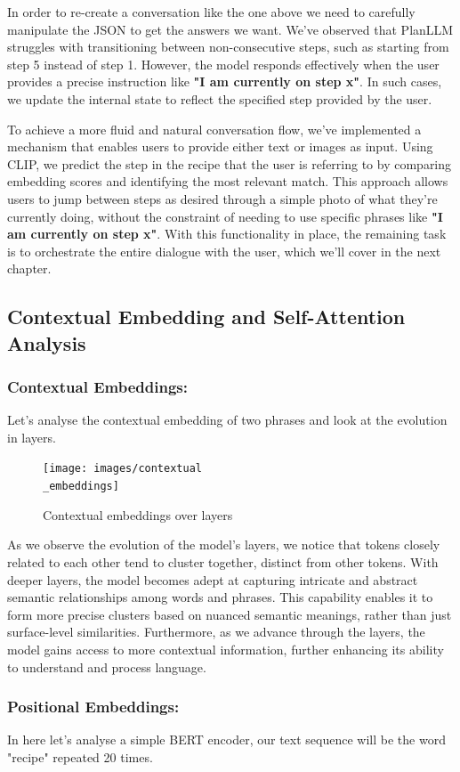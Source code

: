 \documentclass[runningheads]{llncs}
\begin{document}
In order to re-create a conversation like the one above we need to carefully manipulate the JSON to get the answers we want. We've observed that PlanLLM struggles with transitioning between non-consecutive steps, such as starting from step 5 instead of step 1. However, the model responds effectively when the user provides a precise instruction like \textbf{"I am currently on step x"}. In such cases, we update the internal state to reflect the specified step provided by the user.

To achieve a more fluid and natural conversation flow, we've implemented a mechanism that enables users to provide either text or images as input. Using CLIP, we predict the step in the recipe that the user is referring to by comparing embedding scores and identifying the most relevant match. This approach allows users to jump between steps as desired through a simple photo of what they're currently doing, without the constraint of needing to use specific phrases like \textbf{"I am currently on step x"}. With this functionality in place, the remaining task is to orchestrate the entire dialogue with the user, which we'll cover in the next chapter.

\subsection{Contextual Embedding and Self-Attention Analysis}
\subsubsection{Contextual Embeddings:}
Let's analyse the contextual embedding of two phrases and look at the evolution in layers.

\begin{figure}[!htbp]
    \center
    \texttt{[image: images/contextual\\\_embeddings]}
    \caption{Contextual embeddings over layers}
\end{figure}
As we observe the evolution of the model's layers, we notice that tokens closely related to each other tend to cluster together, distinct from other tokens. With deeper layers, the model becomes adept at capturing intricate and abstract semantic relationships among words and phrases. This capability enables it to form more precise clusters based on nuanced semantic meanings, rather than just surface-level similarities. Furthermore, as we advance through the layers, the model gains access to more contextual information, further enhancing its ability to understand and process language.\subsubsection{Positional Embeddings:}
In here let's analyse a simple BERT encoder, our text sequence will be the word "recipe" repeated 20 times.\\[10pt]
\end{document}
